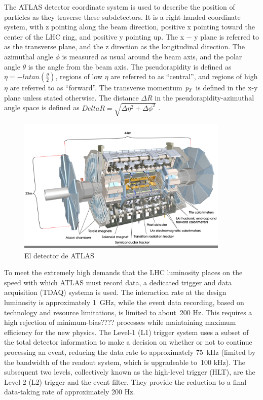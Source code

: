 The ATLAS detector coordinate system is used to describe the position of particles as they traverse these subdetectors. It is a right-handed coordinate system, with z pointing along the beam direction, positive x pointing toward the center of the LHC ring, and positive y pointing up. The x − y plane is referred to as the transverse plane, and the z direction as the longitudinal
direction. The azimuthal angle $\phi$ is measured as usual around the beam axis, and the polar angle $\theta$ is the angle from the beam axis. The pseudorapidity is defined as $\eta = − ln tan(\frac{\theta}{2})$, regions of low $\eta$ are referred to as ``central'', and regions of high $\eta$ are referred to as ``forward''. %
The transverse momentum ${\emph{p}_{T}}$ is defined in the x-y plane unless stated otherwise. The distance $\Delta R$ in the pseudorapidity-azimuthal angle space is defined as $Delta R = \sqrt{ \Delta \eta^2  + \Delta \phi^2}$ .

\begin{figure}[htbp]
  \begin{center}
      \includegraphics[width=0.9\textwidth]{Fig2/ATLASDetector.pdf}
    \caption{El detector de ATLAS}
    \label{fig:ATLAS}
  \end{center}
\end{figure}

To meet the extremely high demands that the LHC luminosity places on the speed with which ATLAS must record data, a dedicated trigger and data acquisition (TDAQ) systema is used. The interaction rate at the design luminosity is approximately 1~GHz, while the event data recording, based on technology and resource limitations, is limited to about~200 Hz. This requires a high rejection of minimum-bias???? processes while maintaining maximum efficiency for the new physics. The Level-1 (L1) trigger system uses a
subset of the total detector information to make a decision on whether or not to continue processing an event, reducing the data rate to approximately 75~kHz (limited by the bandwidth of the readout system, which is upgradeable to~100 kHz). The subsequent two levels, collectively known as the high-level trigger (HLT), are the Level-2 (L2) trigger and the event filter. They provide the reduction to a final data-taking rate of approximately 200 Hz. 



